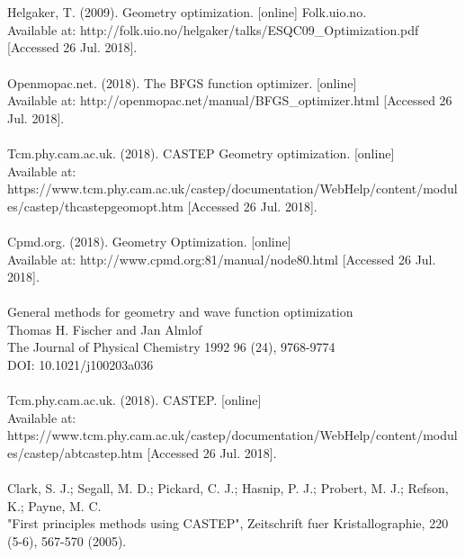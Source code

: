 \documentclass[9pt]{article}
\begin{document}
\\
\\
Helgaker, T. (2009). Geometry optimization. [online] Folk.uio.no. 
\\Available at: http://folk.uio.no/helgaker/talks/ESQC09\_Optimization.pdf [Accessed 26 Jul. 2018].
\\
\\
Openmopac.net. (2018). The BFGS function optimizer. [online] 
\\Available at: http://openmopac.net/manual/BFGS\_optimizer.html [Accessed 26 Jul. 2018].
\\
\\
Tcm.phy.cam.ac.uk. (2018). CASTEP Geometry optimization. [online] 
\\Available at: https://www.tcm.phy.cam.ac.uk/castep/documentation/WebHelp/content/modules/castep/thcastepgeomopt.htm [Accessed 26 Jul. 2018].
\\
\\
Cpmd.org. (2018). Geometry Optimization. [online] 
\\Available at: http://www.cpmd.org:81/manual/node80.html [Accessed 26 Jul. 2018].
\\
\\
General methods for geometry and wave function optimization
\\Thomas H. Fischer and Jan Almlof
\\The Journal of Physical Chemistry 1992 96 (24), 9768-9774
\\DOI: 10.1021/j100203a036
\\
\\
Tcm.phy.cam.ac.uk. (2018). CASTEP. [online] 
\\Available at: https://www.tcm.phy.cam.ac.uk/castep/documentation/WebHelp/content/modules/castep/abtcastep.htm [Accessed 26 Jul. 2018].
\\
\\
Clark, S. J.; Segall, M. D.; Pickard, C. J.; Hasnip, P. J.; Probert, M. J.; Refson, K.; Payne, M. C. 
\\"First principles methods using CASTEP", Zeitschrift fuer Kristallographie, 220 (5-6), 567-570 (2005).
\\
\\
\end{document}
